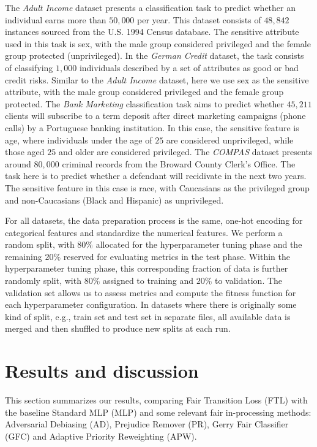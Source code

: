 The \textit{Adult Income} dataset presents a classification task to predict whether an individual earns more than $50,000$ per year. This dataset consists of $48,842$ instances sourced from the U.S. 1994 Census database. The sensitive attribute used in this task is sex, with the male group considered privileged and the female group protected (unprivileged). In the \textit{German Credit} dataset, the task consists of classifying $1,000$ individuals described by a set of attributes as good or bad credit risks. Similar to the \textit{Adult Income} dataset, here we use sex as the sensitive attribute, with the male group considered privileged and the female group protected. The \textit{Bank Marketing} classification task aims to predict whether $45,211$ clients will subscribe to a term deposit after direct marketing campaigns (phone calls) by a Portuguese banking institution. In this case, the sensitive feature is age, where individuals under the age of $25$ are considered unprivileged, while those aged $25$ and older are considered privileged. The \textit{COMPAS} dataset presents around $80,000$ criminal records from the Broward County Clerk’s Office. The task here is to predict whether a defendant will recidivate in the next two years. The sensitive feature in this case is race, with Caucasians as the privileged group and non-Caucasians (Black and Hispanic) as unprivileged.

For all datasets, the data preparation process is the same, one-hot encoding for categorical features and standardize the numerical features. We perform a random split, with $80\%$ allocated for the hyperparameter tuning phase and the remaining $20\%$ reserved for evaluating metrics in the test phase. Within the hyperparameter tuning phase, this corresponding fraction of data is further randomly split, with $80\%$ assigned to training and $20\%$ to validation. The validation set allows us to assess metrics and compute the fitness function for each hyperparameter configuration. In datasets where there is originally some kind of split, e.g., train set and test set in separate files, all available data is merged and then shuffled to produce new splits at each run.

\section{Results and discussion} \label{sec:ftl_results}

This section summarizes our results, comparing Fair Transition Loss (FTL) with the baseline Standard MLP (MLP) and some relevant fair in-processing methods: Adversarial Debiasing (AD), Prejudice Remover (PR), Gerry Fair Classifier (GFC) and Adaptive Priority Reweighting (APW).

